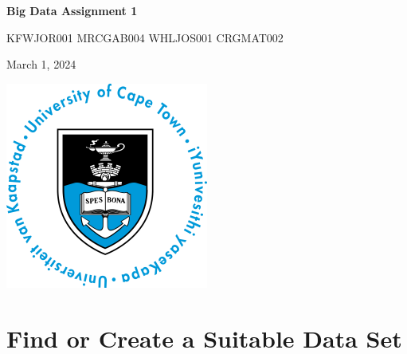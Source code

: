 \documentclass[11pt]{article}
\author{Matthew}
\date{\today}
\title{}
\begin{document}
\begin{LATEX}
\begin{titlepage}

  \centering
  {\Large\bfseries Big Data Assignment 1 \par}
  \vspace{0.5cm}

  {\large KFWJOR001 MRCGAB004 WHLJOS001 CRGMAT002\par}
  \vspace{0.5cm}

  {\large March 1, 2024\par}

  \vspace{2cm}
  \includegraphics[width=0.5\textwidth]{uct.png}
\end{titlepage}
\tableofcontents
\end{LATEX}
\pagebreak
\section{Find or Create a Suitable Data Set}
\label{sec:org62b4c2f}
\end{document}

